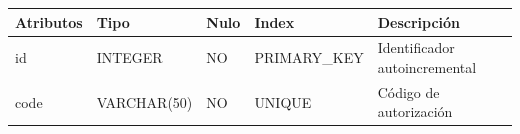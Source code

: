 \documentclass[12pt,a4paperpaper,]{report}
\begin{document}
\begin{longtable}[]{@{}lllll@{}}
\toprule
\begin{minipage}[b]{0.21\columnwidth}\raggedright\strut
Atributos\strut
\end{minipage} & \begin{minipage}[b]{0.19\columnwidth}\raggedright\strut
Tipo\strut
\end{minipage} & \begin{minipage}[b]{0.16\columnwidth}\raggedright\strut
Nulo\strut
\end{minipage} & \begin{minipage}[b]{0.19\columnwidth}\raggedright\strut
Index\strut
\end{minipage} & \begin{minipage}[b]{0.11\columnwidth}\raggedright\strut
Descripción\strut
\end{minipage}\tabularnewline
\midrule
\endhead
\begin{minipage}[t]{0.21\columnwidth}\raggedright\strut
id\strut
\end{minipage} & \begin{minipage}[t]{0.19\columnwidth}\raggedright\strut
INTEGER\strut
\end{minipage} & \begin{minipage}[t]{0.16\columnwidth}\raggedright\strut
NO\strut
\end{minipage} & \begin{minipage}[t]{0.19\columnwidth}\raggedright\strut
PRIMARY\_KEY\strut
\end{minipage} & \begin{minipage}[t]{0.11\columnwidth}\raggedright\strut
Identificador autoincremental\strut
\end{minipage}\tabularnewline
\begin{minipage}[t]{0.21\columnwidth}\raggedright\strut
code\strut
\end{minipage} & \begin{minipage}[t]{0.19\columnwidth}\raggedright\strut
VARCHAR(50)\strut
\end{minipage} & \begin{minipage}[t]{0.16\columnwidth}\raggedright\strut
NO\strut
\end{minipage} & \begin{minipage}[t]{0.19\columnwidth}\raggedright\strut
UNIQUE\strut
\end{minipage} & \begin{minipage}[t]{0.11\columnwidth}\raggedright\strut
Código de autorización\strut
\end{minipage}\tabularnewline

\end{longtable}
\end{document}
